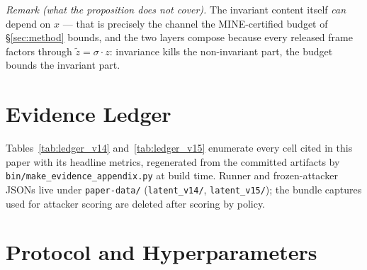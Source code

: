 \documentclass[10pt]{article}
\begin{document}
\emph{Remark (what the proposition does not cover).}  The invariant
content itself \emph{can} depend on $x$ — that is precisely the channel
the MINE-certified budget of \S\ref{sec:method} bounds, and the two
layers compose because every released frame factors through
$\tilde z = \sigma \cdot z$: invariance kills the non-invariant part,
the budget bounds the invariant part.

\section{Evidence Ledger}
\label{app:ledger}

Tables~\ref{tab:ledger_v14} and~\ref{tab:ledger_v15} enumerate every
cell cited in this paper with its headline metrics, regenerated from the
committed artifacts by \texttt{bin/make\_evidence\_appendix.py} at build
time.  Runner and frozen-attacker JSONs live under \texttt{paper-data/}
(\texttt{latent\_v14/}, \texttt{latent\_v15/});
the bundle captures used for attacker scoring are deleted after scoring
by policy.



\section{Protocol and Hyperparameters}
\label{app:protocol}
\end{document}
